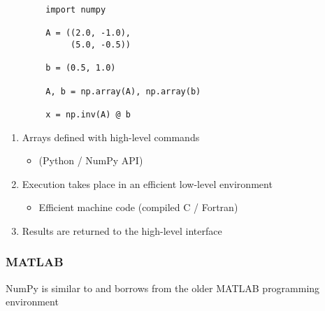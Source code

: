 \begin{frame}[fragile]

    \begin{verbatim}
        import numpy 

        A = ((2.0, -1.0),
             (5.0, -0.5))

        b = (0.5, 1.0)

        A, b = np.array(A), np.array(b)

        x = np.inv(A) @ b
    \end{verbatim}

\end{frame}

\begin{frame}
    
    \begin{enumerate}
        \item Arrays defined with high-level commands 
        \vspace{0.5em}
        \begin{itemize}
            \item (Python / NumPy API)
        \end{itemize}
        \vspace{0.5em}
        \item Execution takes place in an efficient low-level environment
        \vspace{0.5em}
        \begin{itemize}
            \item Efficient machine code (compiled C / Fortran)
        \end{itemize}
        \vspace{0.5em}
        \item Results are returned to the high-level interface
    \end{enumerate}

\end{frame}


\begin{frame}
    \frametitle{MATLAB}

    NumPy is similar to and borrows from the older MATLAB programming
    environment

    \vspace{0.5em}
    \vspace{0.5em}
    \begin{figure}
       \begin{center} %
       \end{center}
    \end{figure}


\end{frame}


